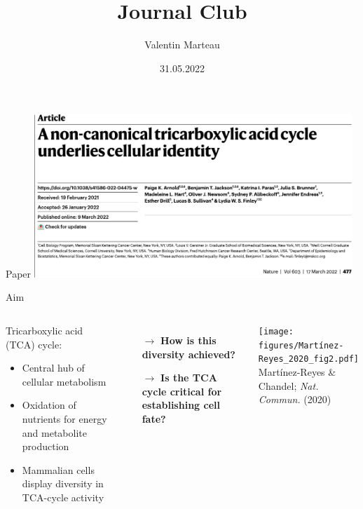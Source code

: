 \documentclass[10pt, aspectratio=169]{beamer}
\title{Journal Club}
\author{Valentin Marteau}
\date{31.05.2022}
\begin{document}
\frame{\titlepage}

\begin{frame}{Paper}
\centering
\includegraphics[width=0.9\textwidth]{figures/Arnold_2022_title.pdf}
\end{frame}

\begin{frame}{Aim}
\begin{columns}

\begin{block}{\centering Tricarboxylic acid (TCA) cycle:}
\vspace{0.2cm}
    \begin{itemize}
        \item Central hub of cellular metabolism \\[0.1cm]
        \item Oxidation of nutrients for energy and metabolite production \\[0.1cm]
        \item Mammalian cells display diversity in TCA-cycle activity \\[0.1cm]
    \end{itemize}
\vspace{0.2cm}
\end{block}


\vspace{0.6cm}

\begin{itemize}
    \item[$\rightarrow$] \textbf{How is this diversity achieved?} \\[0.3cm]
    \item[$\rightarrow$] \textbf{Is the TCA cycle critical for establishing cell fate?}
\end{itemize}

\centering
\texttt{[image: figures/Martínez-Reyes\_2020\_fig2.pdf]}\\[0.1cm]
\tiny{Martínez-Reyes \& Chandel; \textit{Nat. Commun.} (2020)}
\end{columns}
\end{frame}
\end{document}

